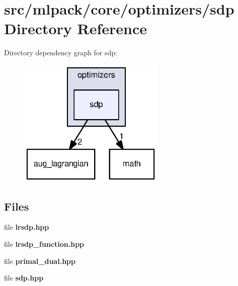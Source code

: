 \section{src/mlpack/core/optimizers/sdp Directory Reference}
\label{dir_cef0860c8727e0fef4b30c067d38228f}
Directory dependency graph for sdp\+:
\nopagebreak
\begin{figure}[H]
\begin{center}
\leavevmode
\includegraphics[width=198pt]{dir_cef0860c8727e0fef4b30c067d38228f_dep}
\end{center}
\end{figure}
\subsection*{Files}
\begin{DoxyCompactItemize}
\item 
file {\bf lrsdp.\+hpp}
\item 
file {\bf lrsdp\+\_\+function.\+hpp}
\item 
file {\bf primal\+\_\+dual.\+hpp}
\item 
file {\bf sdp.\+hpp}
\end{DoxyCompactItemize}
